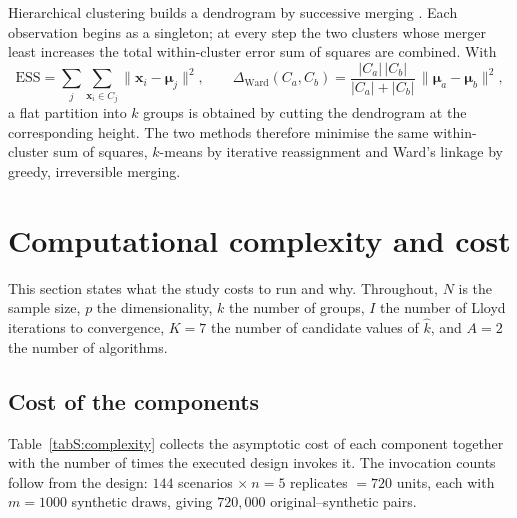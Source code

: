 \documentclass[pdflatex,referee]{sn-jnl}
\newcommand{\bx}{\mathbf{x}}
\newcommand{\bmu}{\boldsymbol{\mu}}
\begin{document}
Hierarchical clustering builds a dendrogram by successive merging
\citep{ward1963}. Each observation begins as a singleton; at every step the two
clusters whose merger least increases the total within-cluster error sum of
squares are combined. With
\begin{equation}
  \mathrm{ESS} = \sum_j \sum_{\bx_i \in C_j} \lVert \bx_i - \bmu_j \rVert^2,
  \qquad
  \Delta_{\text{Ward}}(C_a, C_b)
    = \frac{|C_a|\,|C_b|}{|C_a| + |C_b|}\,
      \lVert \bmu_a - \bmu_b \rVert^2 ,
  \label{eq:ward}
\end{equation}
a flat partition into $k$ groups is obtained by cutting the dendrogram at the
corresponding height. The two methods therefore minimise the same
within-cluster sum of squares, $k$-means by iterative reassignment and Ward's
linkage by greedy, irreversible merging.

\section{Computational complexity and cost}
\label{sec:complexity}

This section states what the study costs to run and why. Throughout, $N$ is the
sample size, $p$ the dimensionality, $k$ the number of groups, $I$ the number of
Lloyd iterations to convergence, $K = 7$ the number of candidate values of
$\hat{k}$, and $A = 2$ the number of algorithms.

\subsection{Cost of the components}

Table~\ref{tabS:complexity} collects the asymptotic cost of each component
together with the number of times the executed design invokes it. The
invocation counts follow from the design: $144$ scenarios $\times\ n = 5$
replicates $= 720$ units, each with $m = 1000$ synthetic draws, giving
$720{,}000$ original--synthetic pairs.
\end{document}

